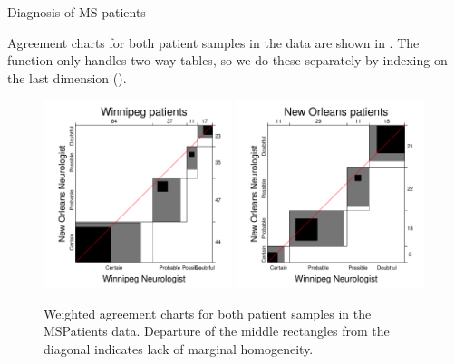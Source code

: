 \documentclass[11pt]{book}
\renewenvironment{knitrout}{\small\renewcommand{\baselinestretch}{.85}}{} %
\begin{document}
\begin{Example}[MS2]{Diagnosis of MS patients}

Agreement charts for both patient samples in the  data
are shown in . The  function
only handles two-way tables, so we do these separately by indexing
on the last dimension ().

\begin{knitrout}
\color{fgcolor}\begin{kframe}
\begin{alltt}
\hlstd{(MSPatients[,,}\hlstd{],} \hlstd{=}\hlstd{)}
\hlstd{(MSPatients[,,}\hlstd{],} \hlstd{=}\hlstd{)}
\end{alltt}
\end{kframe}\begin{figure}[!htbp]


\centerline{\includegraphics[width=0.49\textwidth]{ch04/fig/MS-agree1} 
\includegraphics[width=0.49\textwidth]{ch04/fig/MS-agree2} }

\caption[Weighted agreement charts for both patient samples in the MSPatients data]{Weighted agreement charts for both patient samples in the MSPatients data. Departure of the middle rectangles from the diagonal indicates lack of marginal homogeneity.\label{fig:MS-agree}}
\end{figure}



\end{knitrout}
\end{Example}
\end{document}
